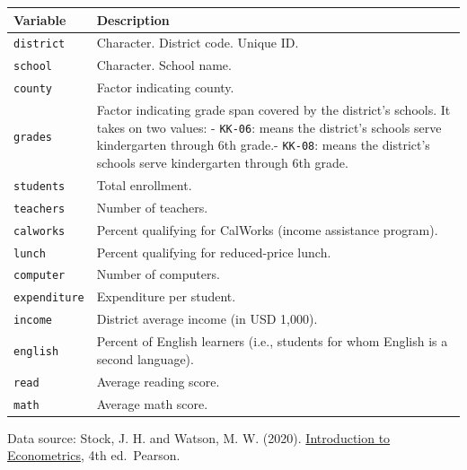 \documentclass[
  12pt,
  letterpaper,
]{scrbook}
\theoremstyle{definition}
\theoremstyle{plain}
\theoremstyle{remark}
\begin{document}
\begin{longtable}[]{@{}
  >{\raggedright\arraybackslash}p{}
  >{\raggedright\arraybackslash}p{}@{}}
\toprule\noalign{}
\begin{minipage}[b]{\linewidth}\raggedright
Variable
\end{minipage} & \begin{minipage}[b]{\linewidth}\raggedright
Description
\end{minipage} \\
\midrule\noalign{}
\endhead
\bottomrule\noalign{}
\endlastfoot
\texttt{district} & Character. District code. Unique ID. \\
\texttt{school} & Character. School name. \\
\texttt{county} & Factor indicating county. \\
\texttt{grades} & Factor indicating grade span covered by the district's
schools. It takes on two values: - \texttt{KK-06}: means the district's
schools serve kindergarten through 6th grade.- \texttt{KK-08}: means the
district's schools serve kindergarten through 6th grade. \\
\texttt{students} & Total enrollment. \\
\texttt{teachers} & Number of teachers. \\
\texttt{calworks} & Percent qualifying for CalWorks (income assistance
program). \\
\texttt{lunch} & Percent qualifying for reduced-price lunch. \\
\texttt{computer} & Number of computers. \\
\texttt{expenditure} & Expenditure per student. \\
\texttt{income} & District average income (in USD 1,000). \\
\texttt{english} & Percent of English learners (i.e., students for whom
English is a second language). \\
\texttt{read} & Average reading score. \\
\texttt{math} & Average math score. \\
\end{longtable}

Data source: Stock, J. H. and Watson, M. W. (2020).
\href{https://www.sea-stat.com/wp-content/uploads/2020/08/James-H.-Stock-Mark-W.-Watson-Introduction-to-Econometrics-Global-Edition-Pearson-Education-Limited-2020.pdf}{Introduction
to Econometrics}, 4th ed.~Pearson.
\end{document}
